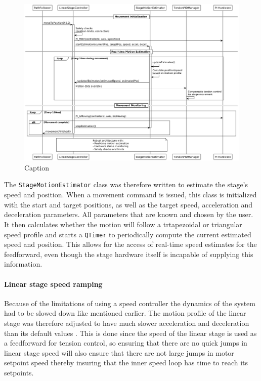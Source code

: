 \begin{figure}
    \centering
    \includegraphics[width=\linewidth]{images/linearstage/movetopos_sequencediag.png}
    \caption{Caption}
    \label{fig:enter-label}
\end{figure}

The \texttt{StageMotionEstimator} class was therefore written to estimate the stage's speed and position. When a movement command is issued, this class is initialized with the start and target positions, as well as the target speed, acceleration and deceleration parameters. All parameters that are known and chosen by the user. It then calculates whether the motion will follow a trtapezoidal or triangular speed profile and starts a \texttt{QTimer} to periodically compute the current estimated speed and position. This allows for the access of real-time speed estimates for the feedforward, even though the stage hardware itself is incapable of supplying this information.


\paragraph*{Linear stage speed ramping}
Because of the limitations of using a speed controller the dynamics of the system had to be slowed down like mentioned earlier. The motion profile of the linear stage was therefore adjusted to have much slower acceleration and deceleration than its default values . This is done since the speed of the linear stage is used as a feedforward for tension control, so ensuring that there are no quick jumps in linear stage speed will also ensure that there are not large jumps in motor setpoint speed thereby insuring that the inner speed loop has time to reach its setpoints.


